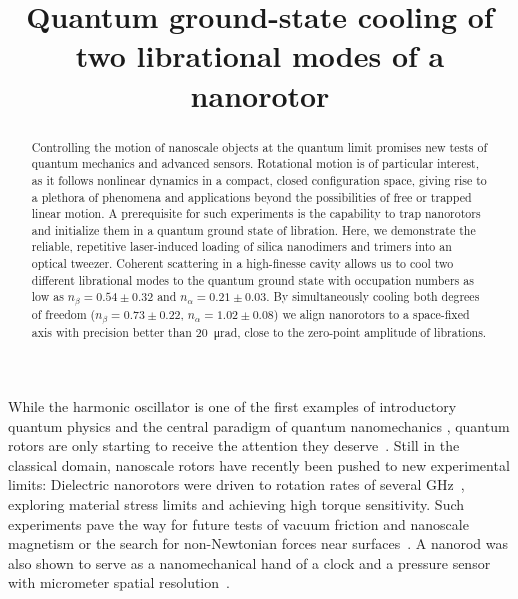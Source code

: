 \documentclass[reprint, amsmath, amssymb, superscriptaddress,showkeys,aps,pra]{revtex4-2}
\begin{document}
\title{Quantum ground-state cooling of two librational modes of a nanorotor}



\begin{abstract}
Controlling the motion of nanoscale objects at the quantum limit promises new tests of quantum mechanics and advanced sensors. Rotational motion is of particular interest, as it follows nonlinear dynamics in a compact, closed configuration space, giving rise to a plethora of phenomena and applications beyond the possibilities of free or trapped linear motion.
A prerequisite for such experiments is the capability to trap nanorotors and initialize them in a quantum ground state of libration.
Here, we demonstrate the reliable, repetitive laser-induced loading of silica nano\-dimers and trimers into an optical tweezer.
Coherent scattering in a high-finesse cavity allows us to cool two different librational modes to the quantum ground state with occupation numbers as low as $n_{\beta}=0.54\pm0.32$ and $n_{\alpha}=0.21\pm0.03$. 
By simultaneously cooling both degrees of freedom ($n_\beta=0.73\pm0.22$, $n_\alpha=1.02\pm0.08$) we align nanorotors to a space-fixed axis with precision better than \qty{20}{\micro rad}, close to the zero-point amplitude of librations.
\end{abstract}


\maketitle

While the harmonic oscillator is one of the first examples of introductory quantum physics \cite{Sakurai_Napolitano_2020} and the central paradigm of quantum nanomechanics \cite{delic_cooling_2020,tebbenjohanns_quantum_2021,magrini_real-time_2021,ranfagni_two-dimensional_2022,deplano2025high,piotrowski_simultaneous_2023,wang2024ground,whittle2021approaching,teufel2011sideband}, quantum rotors are only starting to receive the attention they deserve~\cite{hoang_torsional_2016,Stickler2018,Rashid2018,koch_quantum_2019}. Still in the classical domain, nanoscale rotors have recently been pushed to new experimental limits: Dielectric nanorotors were driven to rotation rates of several GHz~\cite{Ahn2018,reimann_ghz_2018, Yu2021, Ahn2020,jin_6_2021}, exploring material stress limits and achieving high torque sensitivity. Such experiments pave the way for future tests of vacuum friction and nanoscale magnetism or the search for non-Newtonian forces near surfaces~\cite{Schuck2018,ju_near-field_2023}. A nanorod was also shown to serve as a nanomechanical hand of a clock and a pressure sensor with micrometer spatial resolution~\cite{kuhn_optically_2017}.
\end{document}
